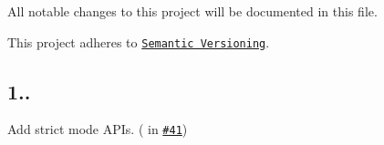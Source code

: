 All notable changes to this project will be documented in this file.

This project adheres to \href{http://semver.org/}{\tt Semantic Versioning}.

\subsection*{1..}


\begin{DoxyItemize}
\item Add strict mode A\+P\+Is. (\href{https://github.com/lukechilds}{\tt } in \href{https://github.com/browserify/commonjs-assert/pull/41}{\tt \#41}) 
\end{DoxyItemize}